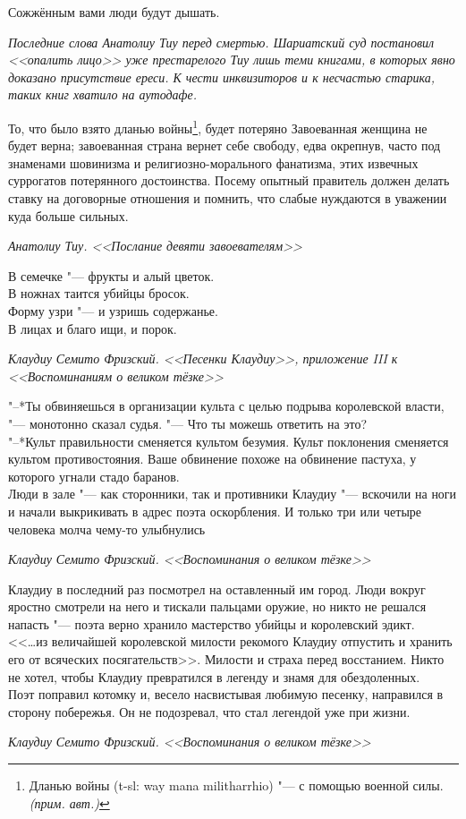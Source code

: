 \documentclass[a4paper,10pt]{book}
\newcommand{\ldotst}{\so{...}\xspace}
\newcommand{\authornote}{\textit{(прим. авт.)}}
\begin{document}
\epigraph{Сожжённым вами люди будут дышать.}
{\textit{Последние слова Анатолиу Тиу перед смертью.
Шариатский суд постановил <<опалить лицо>> уже престарелого Тиу лишь теми книгами, в которых явно доказано присутствие ереси.
К чести инквизиторов и к несчастью старика, таких книг хватило на аутодафе.}}

\epigraph{То, что было взято дланью войны\footnote
{Дланью войны (t-sl: way mana militharrhio) "--- с помощью военной силы. \authornote},
будет потеряно\ldotst
Завоеванная женщина не будет верна;
завоеванная страна вернет себе свободу, едва окрепнув, часто под знаменами шовинизма и религиозно-морального фанатизма, этих извечных суррогатов потерянного достоинства.
Посему опытный правитель должен делать ставку на договорные отношения\ldotst и помнить, что слабые нуждаются в уважении куда больше сильных.}
{\textit{Анатолиу Тиу. <<Послание девяти завоевателям>>}}

\epigraph{В семечке "--- фрукты и алый цветок.\\
В ножнах таится убийцы бросок.\\
Форму узри "--- и узришь содержанье.\\
В лицах и благо ищи, и порок.}
{\textit{Клаудиу Семито Фризский. <<Песенки Клаудиу>>, приложение III к <<Воспоминаниям о великом тёзке>>}}

\epigraph{"--*Ты обвиняешься в организации культа с целью подрыва королевской власти, "--- монотонно сказал судья.
"--- Что ты можешь ответить на это?\\
"--*Культ правильности сменяется культом безумия.
Культ поклонения сменяется культом противостояния.
Ваше обвинение похоже на обвинение пастуха, у которого угнали стадо баранов.\\
Люди в зале "--- как сторонники, так и противники Клаудиу "--- вскочили на ноги и начали выкрикивать в адрес поэта оскорбления.
И только три или четыре человека молча чему-то улыбнулись\ldotst}
{\textit{Клаудиу Семито Фризский. <<Воспоминания о великом тёзке>>}}

\epigraph{Клаудиу в последний раз посмотрел на оставленный им город.
Люди вокруг яростно смотрели на него и тискали пальцами оружие, но никто не решался напасть "--- поэта верно хранило мастерство убийцы и королевский эдикт.\\
<<\ldots из величайшей королевской милости рекомого Клаудиу отпустить и хранить его от всяческих посягательств>>.
Милости и страха перед восстанием.
Никто не хотел, чтобы Клаудиу превратился в легенду и знамя для обездоленных.\\
Поэт поправил котомку и, весело насвистывая любимую песенку, направился в сторону побережья.
Он не подозревал, что стал легендой уже при жизни.}
{\textit{Клаудиу Семито Фризский. <<Воспоминания о великом тёзке>>}}
\end{document}
